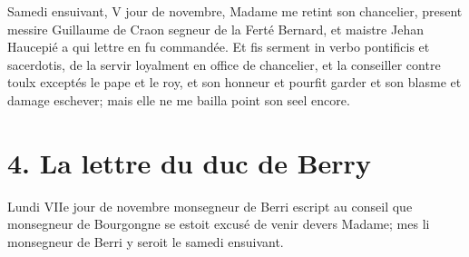 \documentclass[]{book}
\begin{document}
            
            Samedi ensuivant, V jour de novembre, Madame me retint son chancelier, present messire Guillaume de Craon segneur de la Ferté Bernard, et maistre Jehan Haucepié a qui lettre en fu commandée. Et fis serment in verbo pontificis et sacerdotis, de la servir loyalment en office de chancelier, et la conseiller contre toulx exceptés le pape et le roy, et son honneur et pourfit garder et son blasme et damage eschever; mais elle ne me bailla point son seel encore.
                    
                
            \chapter*{4. La lettre du duc de Berry}
            
            
            Lundi VIIe jour de novembre monsegneur de Berri escript au conseil que monsegneur de Bourgongne se estoit excusé de venir devers Madame; mes li monsegneur de Berri y seroit le samedi ensuivant.
                    
                
        
        \printindex[indiv]
        \printindex[lieux]
        
        
        \tableofcontents
        
        
\end{document}
